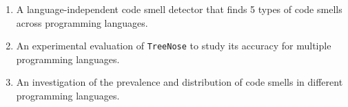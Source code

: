 \begin{enumerate}
    \item A language-independent code smell detector that finds 5 types of code
        smells across programming languages.
    \item An experimental evaluation of \texttt{TreeNose} to study its accuracy
        for multiple programming languages.
    \item An investigation of the prevalence and distribution of code
        smells in different programming languages.
\end{enumerate}
